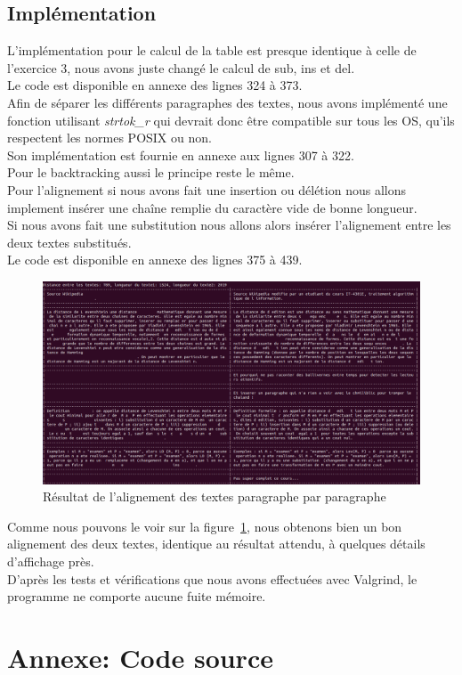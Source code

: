 \documentclass{article}
\begin{document}
\subsection{Implémentation}

L'implémentation pour le calcul de la table est presque identique à celle de
l'exercice 3, nous avons juste changé le calcul de sub, ins et del.\\
Le code est disponible en annexe des lignes 324 à 373.\\
Afin de séparer les différents paragraphes des textes, nous avons implémenté
une fonction utilisant \textit{strtok\_r} qui devrait donc être compatible sur tous les
OS, qu'ils respectent les normes POSIX ou non.\\
Son implémentation est fournie en annexe aux lignes 307 à 322.\\

Pour le backtracking aussi le principe reste le même.\\
Pour l'alignement si nous avons fait une insertion ou délétion nous allons
implement insérer une chaîne remplie du caractère vide de bonne longueur.\\
Si nous avons fait une substitution nous allons alors insérer l'alignement
entre les deux textes substitués.\\
Le code est disponible en annexe des lignes 375 à 439.\\

\begin{figure}[!hbt]
	\centering
	\includegraphics[width=0.95\linewidth]{./images/exo4.png}
	\caption{Résultat de l'alignement des textes paragraphe par paragraphe}%
	\label{fig:exo4}
\end{figure}

Comme nous pouvons le voir sur la figure~\ref{fig:exo4}, nous obtenons bien un
bon alignement des deux textes, identique au résultat attendu, à quelques
détails d'affichage près.\\

D'après les tests et vérifications que nous avons effectuées avec Valgrind, le
programme ne comporte aucune fuite mémoire.\\


\clearpage
\section{Annexe: Code source}
		
\end{document}
